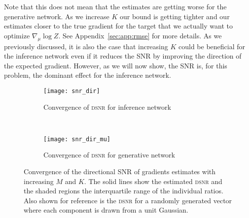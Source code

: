 Note that this does not mean that the 
estimates are getting worse for the generative network.
As we increase $K$ our bound is getting tighter and our estimates closer to
the true gradient for the target that we 
actually want to optimize $\nabla_{\mu} \log Z$.  See 
Appendix~\ref{sec:app:rmse} for more details.
As we previously discussed, it is also the case that increasing $K$ could be beneficial for the inference network
even if it reduces the \gls{SNR} by improving the direction of the expected gradient.
However, as we will now show, the \gls{SNR} is, for this problem,
the dominant effect for the inference network.

\begin{figure*}[t]
	\centering
	\begin{subfigure}[b]{0.4\textwidth}
		\centering
		\texttt{[image: snr\_dir]}\vspace{-2pt}
		\caption{Convergence of \textsc{dsnr} for inference network\label{fig:snr/snr_dir}}
	\end{subfigure}
~~~~~~~~~~~~~~
	\begin{subfigure}[b]{0.4\textwidth}
		\centering
		\texttt{[image: snr\_dir\_mu]}\vspace{-2pt}
		\caption{Convergence of \textsc{dsnr} for generative network\label{fig:snr/snr_dir_mu}}
	\end{subfigure}\vspace{-6pt}
	\caption{Convergence of the directional \gls{SNR} of gradients estimates with increasing $M$ and $K$.
		The solid lines show the estimated \textsc{dsnr} and the shaded regions the interquartile range of
		the individual ratios.  Also shown for reference is the \textsc{dsnr} for a randomly generated
		vector where each component is drawn from a unit Gaussian.
		\vspace{-10pt}
		\label{fig:snr/extra}}
\end{figure*}


